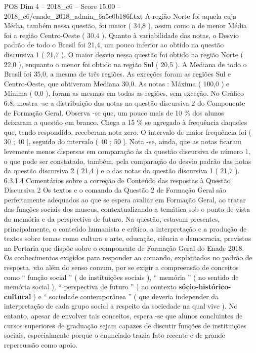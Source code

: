 \begin{textsample}{POS Dim 4 – 2018\_c6 – Score 15.00 – 2018\_c6/enade\_2018\_admin\_6a5e0b186f.txt}
A região Norte foi aquela cuja Média, também nessa questão, foi maior ( 34,8 ), assim como a de menor Média foi a região Centro-Oeste ( 30,4 ).
Quanto à variabilidade das notas, o Desvio padrão de todo o Brasil foi 21,4, um pouco inferior ao obtido na questão discursiva 1 ( 21,7 ).
O maior desvio nessa questão foi obtido na região Norte ( 22,0 ), enquanto o menor foi obtido na região Sul ( 20,5 ).
A Mediana de todo o Brasil foi 35,0, a mesma de três regiões.
As exceções foram as regiões Sul e Centro-Oeste, que obtiveram Mediana 30,0.
As notas : Máxima ( 100,0 ) e Mínima ( 0,0 ), foram as mesmas em todas as regiões, sem exceção.
No Gráfico 6.8, mostra -se a distribuição das notas na questão discursiva 2 do Componente de Formação Geral.
Observa -se que, um pouco mais de 10 \% dos alunos deixaram a questão em branco.
Chega a 15 \% se agregado à frequência daqueles que, tendo respondido, receberam nota zero.
O intervalo de maior frequência foi ( 30 ; 40 ], seguido do intervalo ( 40 ; 50 ].
Nota -se, ainda, que as notas ficaram levemente menos dispersas em comparação às da questão discursiva de número 1, o que pode ser constatado, também, pela comparação do desvio padrão das notas da questão discursiva 2 ( 21,4 ) e o das notas da questão discursiva 1 ( 21,7 ). 6.3.1.4 Comentários sobre a correção de Conteúdo das respostas à Questão Discursiva 2 Os textos e o comando da Questão 2 de Formação Geral são perfeitamente adequados ao que se espera avaliar em Formação Geral, ao tratar das funções sociais dos museus, contextualizando a temática sob o ponto de vista da memória e da perspectiva de futuro.
Na questão, estavam presentes, principalmente, o conteúdo humanista e crítico, a interpretação e a produção de textos sobre temas como cultura e arte, educação, ciência e democracia, previstos na Portaria que dispõe sobre o componente de Formação Geral do Enade 2018.
Os conhecimentos exigidos para responder ao comando, explicitados no padrão de resposta, vão além do senso comum, por se exigir a compreensão de conceitos como “ função social ” ( de instituições sociais ), “ memória ” ( no sentido de memória social ), “ perspectiva de futuro ” ( no contexto \textbf{sócio-histórico-cultural} ) e “ sociedade contemporânea ” ( que deveria independer da interpretação de cada grupo social a respeito da sociedade na qual vive ).
No entanto, apesar de envolver tais conceitos, espera -se que alunos concluintes de cursos superiores de graduação sejam capazes de discutir funções de instituições sociais, especialmente porque o enunciado trazia fato recente e de grande repercussão como apoio.

\end{textsample}

